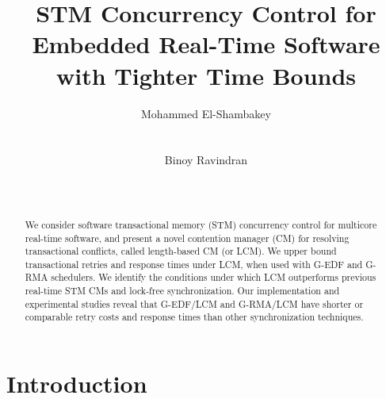 \documentclass{sig-alternate}
\begin{document}
\title{STM Concurrency Control for Embedded Real-Time Software with Tighter Time Bounds}



\author{
\alignauthor Mohammed El-Shambakey\\
\\
\\
\alignauthor Binoy Ravindran\\
\\
\\
}

\maketitle

\begin{abstract}
We consider software transactional memory (STM) concurrency control for multicore real-time software, and present a novel contention manager (CM) for resolving transactional conflicts, called length-based CM (or LCM). We upper bound transactional retries and response times under LCM, when used with G-EDF and  G-RMA schedulers. We identify the conditions under which LCM outperforms previous real-time STM CMs and lock-free synchronization. Our implementation and experimental studies reveal that G-EDF/LCM and G-RMA/LCM have shorter or comparable retry costs and response times than other synchronization techniques.
\end{abstract}


\section{Introduction}
\end{document}
